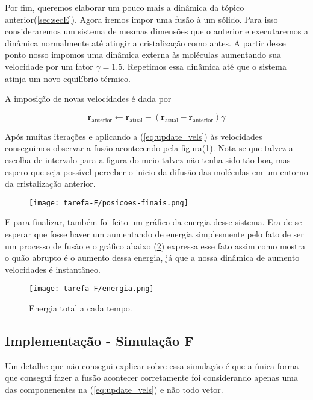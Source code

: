 Por fim, queremos elaborar um pouco mais a dinâmica da tópico anterior(\ref{sec:secE}). 
Agora iremos impor uma fusão à um sólido. Para isso consideraremos um sistema de mesmas dimensões que o anterior 
e executaremos a dinâmica normalmente até atingir a cristalização como antes. A partir desse ponto
nosso impomos uma dinâmica externa às moléculas aumentando sua velocidade por um fator $\gamma = 1.5$. Repetimos 
essa dinâmica até que o sistema atinja um novo equilíbrio térmico. 

A imposição de novas velocidades é dada por 

\begin{equation}
    \mathbf{r}_{\text{anterior}} \longleftarrow \mathbf{r}_{\text{atual}} - (\mathbf{r}_{\text{atual}}-\mathbf{r}_{\text{anterior}})\gamma
    \label{eq:update_vels}
\end{equation}

Após muitas iterações e aplicando a (\ref{eq:update_vels}) às velocidades conseguimos observar a fusão acontecendo pela 
figura(\ref{fig:posicoes-finais-f}). Nota-se que talvez a escolha de intervalo para a figura do meio talvez não tenha sido 
tão boa, mas espero que seja possível perceber o inicio da difusão das moléculas em um entorno da cristalização anterior. 

\begin{figure}[h!]
    \centering
    \texttt{[image: tarefa-F/posicoes-finais.png]}
    \caption{}
    \label{fig:posicoes-finais-f}
\end{figure}


E para finalizar, também foi feito um gráfico da energia desse sistema. Era de se esperar que fosse haver um 
aumentando de energia simplesmente pelo fato de ser um processo de fusão e o gráfico abaixo (\ref{fig:energia-f})
expressa esse fato assim como mostra o quão abrupto é o aumento dessa energia, já que a nossa dinâmica 
de aumento velocidades é instantâneo.

\begin{figure}[h!]
    \centering
    \texttt{[image: tarefa-F/energia.png]}
    \caption{Energia total a cada tempo.}
    \label{fig:energia-f}
\end{figure}


\clearpage
\subsection{Implementação - Simulação F}
Um detalhe que não consegui explicar sobre essa simulação é que a única forma que consegui fazer a fusão acontecer 
corretamente foi considerando apenas uma das componenentes na (\ref{eq:update_vels}) e não todo vetor. 

